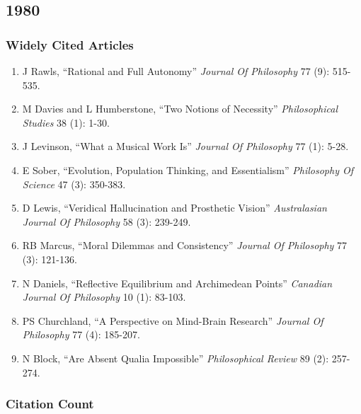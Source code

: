 \documentclass[
  10pt,
  letterpaper,
  DIV=11,
  numbers=noendperiod,
  twoside]{scrartcl}
\providecommand{\tightlist}{%
  \setlength{\itemsep}{0pt}\setlength{\parskip}{0pt}}\usepackage{longtable,booktabs,array}
\begin{document}
\newpage

\subsection{1980}\label{section-4}

\subsubsection*{Widely Cited Articles}\label{widely-cited-articles-4}

\begin{enumerate}
\def\labelenumi{\arabic{enumi}.}
\tightlist
\item
  J Rawls, ``Rational and Full Autonomy'' \emph{Journal Of Philosophy}
  77 (9): 515-535.
\item
  M Davies and L Humberstone, ``Two Notions of Necessity''
  \emph{Philosophical Studies} 38 (1): 1-30.
\item
  J Levinson, ``What a Musical Work Is'' \emph{Journal Of Philosophy} 77
  (1): 5-28.
\item
  E Sober, ``Evolution, Population Thinking, and Essentialism''
  \emph{Philosophy Of Science} 47 (3): 350-383.
\item
  D Lewis, ``Veridical Hallucination and Prosthetic Vision''
  \emph{Australasian Journal Of Philosophy} 58 (3): 239-249.
\item
  RB Marcus, ``Moral Dilemmas and Consistency'' \emph{Journal Of
  Philosophy} 77 (3): 121-136.
\item
  N Daniels, ``Reflective Equilibrium and Archimedean Points''
  \emph{Canadian Journal Of Philosophy} 10 (1): 83-103.
\item
  PS Churchland, ``A Perspective on Mind-Brain Research'' \emph{Journal
  Of Philosophy} 77 (4): 185-207.
\item
  N Block, ``Are Absent Qualia Impossible'' \emph{Philosophical Review}
  89 (2): 257-274.
\end{enumerate}

\subsubsection*{Citation Count}\label{citation-count-4}
\end{document}
